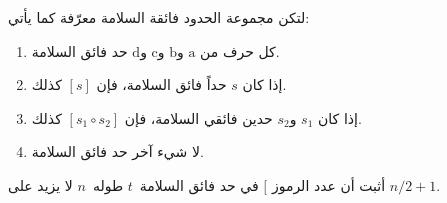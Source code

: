 \documentclass[../../../include/open-logic-section]{subfiles}
\begin{document}
\begin{prob}
  لتكن مجموعة الحدود فائقة السلامة معرّفة كما يأتي:
  \begin{enumerate}
  \item كل حرف من $\mathrm{a}$ و$\mathrm{b}$ و$\mathrm{c}$
    و$\mathrm{d}$ حد فائق السلامة.
  \item إذا كان $s$ حداً فائق السلامة، فإن $[s]$ كذلك.
  \item إذا كان $s_1$ و$s_2$ حدين فائقي السلامة، فإن
    $[s_1 \circ s_2]$ كذلك.
  \item لا شيء آخر حد فائق السلامة.
  \end{enumerate}
  أثبت أن عدد الرموز $[$ في حد فائق السلامة~$t$ طوله~$n$ لا يزيد على
  $n/2 +1$.
\end{prob}
\end{document}
